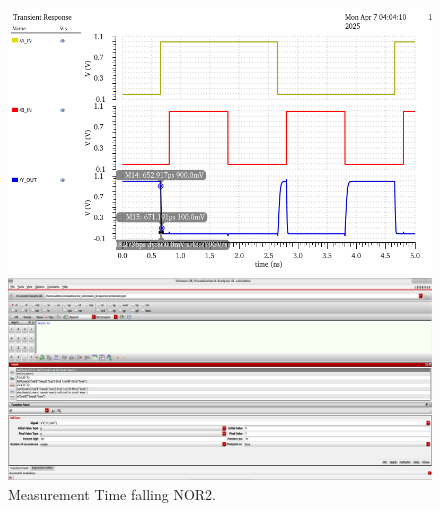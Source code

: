 \begin{figure}[H]
	\begin{minipage}{0.5\linewidth}
		\includegraphics[width=\linewidth]{section/EX1/NOR/EX1_NOR2_Tf_Waveform.png}
	\end{minipage}
	\begin{minipage}{0.5\linewidth}
		\includegraphics[width=\linewidth]{section/EX1/NOR/EX1_NOR2_Tf_Cal.png}
	\end{minipage}
	\caption{Measurement Time falling NOR2.}
\end{figure}

